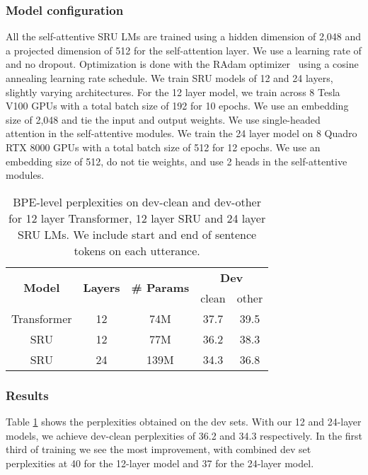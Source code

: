 \documentclass[a4paper]{article}
\begin{document}
\subsubsection{Model configuration}
All the self-attentive SRU LMs are trained using a hidden dimension of 2,048 and a projected dimension of 512 for the self-attention layer. We use a learning rate of  and no dropout. Optimization is done with the RAdam optimizer~\cite{liu2019radam} using a cosine annealing learning rate schedule. We train SRU models of 12 and 24 layers, slightly varying architectures. For the 12 layer model, we train across 8 Tesla V100 GPUs with a total batch size of 192 for 10 epochs. We use an embedding size of 2,048 and tie the input and output weights. We use single-headed attention in the self-attentive modules. We train the 24 layer model on 8 Quadro RTX 8000 GPUs with a total batch size of 512 for 12 epochs. We use an embedding size of 512, do not tie weights, and use 2 heads in the self-attentive modules.

\begin{table}[t]
\centering
\begin{tabular}{c|c|c|c|c}
\hline
\multirow{2}{*}{\textbf{Model}} & \multirow{2}{*}{\textbf{Layers}} & \multirow{2}{*}{\textbf{\# Params}} &\multicolumn{2}{c}{\textbf{Dev}} \\
\cline{4-5}
& & & clean & other \\
\hline
Transformer & 12 & 74M & 37.7 & 39.5 \\
\hline
SRU & 12 & 77M & 36.2 & 38.3 \\
\hline
SRU & 24 & 139M & 34.3 & 36.8 \\
\hline
\end{tabular}
\vspace{1em}
\caption{BPE-level perplexities on dev-clean and dev-other for 12 layer Transformer, 12 layer SRU and 24 layer SRU LMs. We include start and end of sentence tokens on each utterance.}
\label{table:lm_ppl}
\vspace{-5mm}
\end{table}

\subsubsection{Results}
Table \ref{table:lm_ppl} shows the perplexities obtained on the dev sets. With our 12 and 24-layer models, we achieve dev-clean perplexities of 36.2 and 34.3 respectively. In the first third of training we see the most improvement, with combined dev set perplexities at 40 for the 12-layer model and 37 for the 24-layer model.
\end{document}
